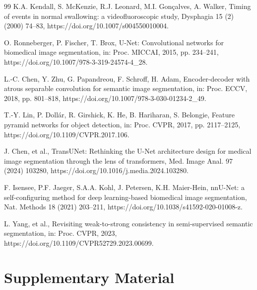 \documentclass[a4paper,fleqn]{cas-dc}
\begin{document}
\begin{thebibliography}{99}
K.A. Kendall, S. McKenzie, R.J. Leonard, M.I. Gon\c{c}alves, A. Walker,
Timing of events in normal swallowing: a videofluoroscopic study,
Dysphagia 15 (2) (2000) 74--83, https://doi.org/10.1007/s004550010004.

O. Ronneberger, P. Fischer, T. Brox,
U-Net: Convolutional networks for biomedical image segmentation,
in: Proc. MICCAI, 2015, pp. 234--241, https://doi.org/10.1007/978-3-319-24574-4\_28.

L.-C. Chen, Y. Zhu, G. Papandreou, F. Schroff, H. Adam,
Encoder-decoder with atrous separable convolution for semantic image segmentation,
in: Proc. ECCV, 2018, pp. 801--818, https://doi.org/10.1007/978-3-030-01234-2\_49.

T.-Y. Lin, P. Doll\'{a}r, R. Girshick, K. He, B. Hariharan, S. Belongie,
Feature pyramid networks for object detection,
in: Proc. CVPR, 2017, pp. 2117--2125, https://doi.org/10.1109/CVPR.2017.106.

J. Chen, et al.,
TransUNet: Rethinking the U-Net architecture design for medical image segmentation through the lens of transformers,
Med. Image Anal. 97 (2024) 103280, https://doi.org/10.1016/j.media.2024.103280.

F. Isensee, P.F. Jaeger, S.A.A. Kohl, J. Petersen, K.H. Maier-Hein,
nnU-Net: a self-configuring method for deep learning-based biomedical image segmentation,
Nat. Methods 18 (2021) 203--211, https://doi.org/10.1038/s41592-020-01008-z.

L. Yang, et al.,
Revisiting weak-to-strong consistency in semi-supervised semantic segmentation,
in: Proc. CVPR, 2023, https://doi.org/10.1109/CVPR52729.2023.00699.

\end{thebibliography}



\clearpage
\onecolumn
\appendix
\section*{Supplementary Material}
\setcounter{table}{0}
\renewcommand{\thetable}{S\arabic{table}}
\end{document}
